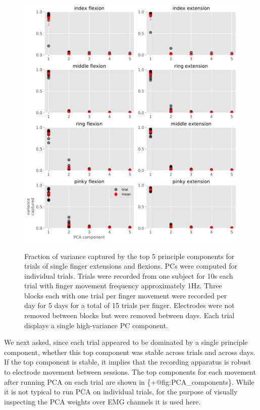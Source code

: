\begin{figure}
\label{fig:PCA_variances}
\centering
\includegraphics[width=1\textwidth,height=\textheight]{images/data_analysis/fingers/PCA_variances.pdf}
\caption{Fraction of variance captured by the top 5 principle components
for trials of single finger extensions and flexions. PCs were computed
for individual trials. Trials were recorded from one subject for 10s
each trial with finger movement frequency approximately 1Hz. Three
blocks each with one trial per finger movement were recorded per day for
5 days for a total of 15 trials per finger. Electrodes were not removed
between blocks but were removed between days. Each trial displays a
single high-variance PC component.}\label{fig:PCA_variances}
\end{figure}

We next asked, since each trial appeared to be dominated by a single
principle component, whether this top component was stable across trials
and across days. If the top component is stable, it implies that the
recording apparatus is robust to electrode movement between sessions.
The top components for each movement after running PCA on each trial are
shown in \{+@fig:PCA\_components\}. While it is not typical to run PCA
on individual trials, for the purpose of visually inspecting the PCA
weights over EMG channels it is used here.

